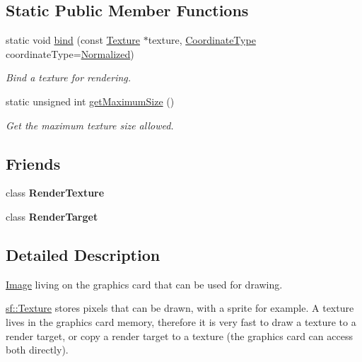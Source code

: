 \subsection*{Static Public Member Functions}
\begin{DoxyCompactItemize}
\item 
static void \hyperlink{classsf_1_1_texture_ae9a4274e7b95ebf7244d09c7445833b0}{bind} (const \hyperlink{classsf_1_1_texture}{Texture} $\ast$texture, \hyperlink{classsf_1_1_texture_aa6fd3bbe3c334b3c4428edfb2765a82e}{Coordinate\+Type} coordinate\+Type=\hyperlink{classsf_1_1_texture_aa6fd3bbe3c334b3c4428edfb2765a82ea69d6228950882e4d68be4ba4dbe7df73}{Normalized})
\begin{DoxyCompactList}\small\item\em Bind a texture for rendering. \end{DoxyCompactList}\item 
static unsigned int \hyperlink{classsf_1_1_texture_a0bf905d487b104b758549c2e9e20a3fb}{get\+Maximum\+Size} ()
\begin{DoxyCompactList}\small\item\em Get the maximum texture size allowed. \end{DoxyCompactList}\end{DoxyCompactItemize}
\subsection*{Friends}
\begin{DoxyCompactItemize}
\item 
\mbox{\label{classsf_1_1_texture_a2548fc9744f5e43e0276d5627ca178de}} 
class {\bfseries Render\+Texture}
\item 
\mbox{\label{classsf_1_1_texture_aa5afc6f82b7b587ed5ada4d227ce32aa}} 
class {\bfseries Render\+Target}
\end{DoxyCompactItemize}


\subsection{Detailed Description}
\hyperlink{classsf_1_1_image}{Image} living on the graphics card that can be used for drawing. 

\hyperlink{classsf_1_1_texture}{sf\+::\+Texture} stores pixels that can be drawn, with a sprite for example. A texture lives in the graphics card memory, therefore it is very fast to draw a texture to a render target, or copy a render target to a texture (the graphics card can access both directly).

